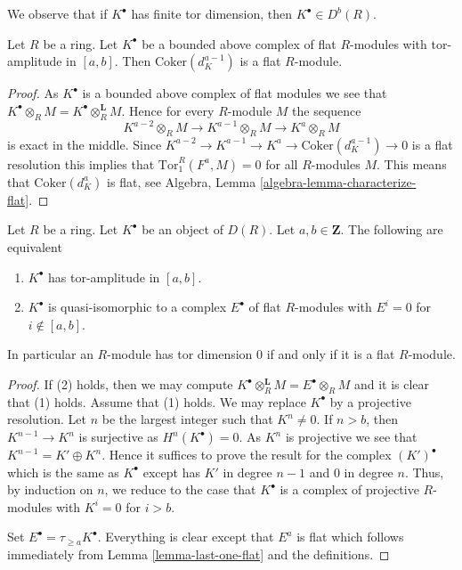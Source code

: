 \noindent
We observe that if $K^\bullet$ has finite tor dimension,
then $K^\bullet \in D^b(R)$.

\begin{lemma}
\label{lemma-last-one-flat}
Let $R$ be a ring. Let $K^\bullet$ be a bounded above complex of
flat $R$-modules with tor-amplitude in $[a, b]$.
Then $\text{Coker}(d_K^{a - 1})$ is a flat $R$-module.
\end{lemma}

\begin{proof}
As $K^\bullet$ is a bounded above complex of flat modules we see
that $K^\bullet \otimes_R M = K^\bullet \otimes_R^{\mathbf{L}} M$.
Hence for every $R$-module $M$ the sequence
$$
K^{a - 2} \otimes_R M \to K^{a - 1} \otimes_R M \to K^a \otimes_R M
$$
is exact in the middle. Since
$K^{a - 2} \to K^{a - 1} \to K^a \to \text{Coker}(d_K^{a - 1}) \to 0$
is a flat resolution this implies that $\text{Tor}_1^R(F^a, M) = 0$
for all $R$-modules $M$. This means that
$\text{Coker}(d_K^a)$ is flat, see
Algebra, Lemma \ref{algebra-lemma-characterize-flat}.
\end{proof}

\begin{lemma}
\label{lemma-tor-amplitude}
Let $R$ be a ring. Let $K^\bullet$ be an object of $D(R)$.
Let $a, b \in \mathbf{Z}$. The following are equivalent
\begin{enumerate}
\item $K^\bullet$ has tor-amplitude in $[a, b]$.
\item $K^\bullet$ is quasi-isomorphic to a complex
$E^\bullet$ of flat $R$-modules with $E^i = 0$ for $i \not \in [a, b]$.
\end{enumerate}
In particular an $R$-module has tor dimension $0$ if and only if
it is a flat $R$-module.
\end{lemma}

\begin{proof}
If (2) holds, then we may compute
$K^\bullet \otimes_R^\mathbf{L} M = E^\bullet \otimes_R M$
and it is clear that (1) holds.
Assume that (1) holds. We may replace $K^\bullet$ by
a projective resolution. 
Let $n$ be the largest integer such that $K^n \not = 0$.
If $n > b$, then $K^{n - 1} \to K^n$ is surjective as
$H^n(K^\bullet) = 0$. As $K^n$ is projective we see that
$K^{n - 1} = K' \oplus K^n$. Hence it suffices to prove the result
for the complex $(K')^\bullet$ which is the same as $K^\bullet$
except has $K'$ in degree $n - 1$ and $0$ in degree $n$.
Thus, by induction on $n$, we reduce to the case that $K^\bullet$
is a complex of projective $R$-modules with $K^i = 0$ for $i > b$.

\medskip\noindent
Set $E^\bullet = \tau_{\geq a}K^\bullet$. Everything is clear except
that $E^a$ is flat which follows immediately from
Lemma \ref{lemma-last-one-flat}
and the definitions.
\end{proof}

